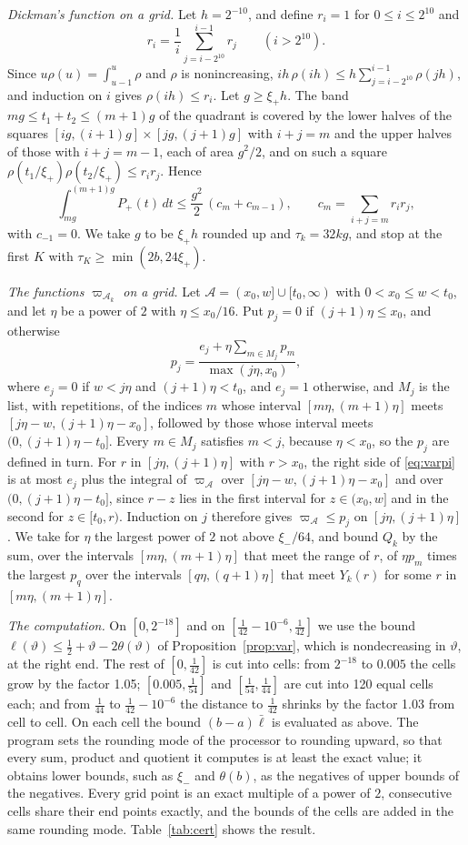 \documentclass[aps,prd,twocolumn,superscriptaddress,nofootinbib,longbibliography,floatfix,showkeys,nobalancelastpage,amsmath,amssymb,10pt]{revtex4-2}
\theoremstyle{plain}
\theoremstyle{definition}
\theoremstyle{plain}
\begin{document}
\emph{Dickman's function on a grid.} Let $h=2^{-10}$, and define $r_i=1$ for $0\le i\le2^{10}$ and
\[
r_i=\frac1i\sum_{j=i-2^{10}}^{i-1}r_j\qquad(i>2^{10}).
\]
Since $u\rho(u)=\int_{u-1}^u\rho$ and $\rho$ is nonincreasing, $ih\,\rho(ih)\le h\sum_{j=i-2^{10}}^{i-1}\rho(jh)$, and induction on $i$ gives $\rho(ih)\le r_i$. Let $g\ge\xi_+h$. The band $mg\le t_1+t_2\le(m+1)g$ of the quadrant is covered by the lower halves of the squares $[ig,(i+1)g]\times[jg,(j+1)g]$ with $i+j=m$ and the upper halves of those with $i+j=m-1$, each of area $g^2/2$, and on such a square $\rho(t_1/\xi_+)\rho(t_2/\xi_+)\le r_ir_j$. Hence
\[
\int_{mg}^{(m+1)g}P_+(t)\,dt\le\frac{g^2}2\,(c_m+c_{m-1}),\qquad c_m=\sum_{i+j=m}r_ir_j,
\]
with $c_{-1}=0$. We take $g$ to be $\xi_+h$ rounded up and $\tau_k=32kg$, and stop at the first $K$ with $\tau_K\ge\min(2b,24\xi_+)$.

\emph{The functions $\varpi_{\mathcal A_k}$ on a grid.} Let $\mathcal A=(x_0,w]\cup[t_0,\infty)$ with $0<x_0\le w<t_0$, and let $\eta$ be a power of $2$ with $\eta\le x_0/16$. Put $p_j=0$ if $(j+1)\eta\le x_0$, and otherwise
\[
p_j=\frac{e_j+\eta\sum_{m\in M_j}p_m}{\max(j\eta,x_0)},
\]
where $e_j=0$ if $w<j\eta$ and $(j+1)\eta<t_0$, and $e_j=1$ otherwise, and $M_j$ is the list, with repetitions, of the indices $m$ whose interval $[m\eta,(m+1)\eta]$ meets $[j\eta-w,(j+1)\eta-x_0]$, followed by those whose interval meets $(0,(j+1)\eta-t_0]$. Every $m\in M_j$ satisfies $m<j$, because $\eta<x_0$, so the $p_j$ are defined in turn. For $r$ in $[j\eta,(j+1)\eta]$ with $r>x_0$, the right side of \eqref{eq:varpi} is at most $e_j$ plus the integral of $\varpi_{\mathcal A}$ over $[j\eta-w,(j+1)\eta-x_0]$ and over $(0,(j+1)\eta-t_0]$, since $r-z$ lies in the first interval for $z\in(x_0,w]$ and in the second for $z\in[t_0,r)$. Induction on $j$ therefore gives $\varpi_{\mathcal A}\le p_j$ on $[j\eta,(j+1)\eta]$. We take for $\eta$ the largest power of $2$ not above $\xi_-/64$, and bound $Q_k$ by the sum, over the intervals $[m\eta,(m+1)\eta]$ that meet the range of $r$, of $\eta p_m$ times the largest $p_q$ over the intervals $[q\eta,(q+1)\eta]$ that meet $Y_k(r)$ for some $r$ in $[m\eta,(m+1)\eta]$.

\emph{The computation.} On $[0,2^{-18}]$ and on $[\frac1{42}-10^{-6},\frac1{42}]$ we use the bound $\ell(\vartheta)\le\frac12+\vartheta-2\theta(\vartheta)$ of Proposition~\ref{prop:var}, which is nondecreasing in $\vartheta$, at the right end. The rest of $[0,\frac1{42}]$ is cut into cells: from $2^{-18}$ to $0.005$ the cells grow by the factor 1.05; $[0.005,\frac1{54}]$ and $[\frac1{54},\frac1{44}]$ are cut into 120 equal cells each; and from $\frac1{44}$ to $\frac1{42}-10^{-6}$ the distance to $\frac1{42}$ shrinks by the factor 1.03 from cell to cell. On each cell the bound $(b-a)\bar\ell$ is evaluated as above. The program sets the rounding mode of the processor to rounding upward, so that every sum, product and quotient it computes is at least the exact value; it obtains lower bounds, such as $\xi_-$ and $\theta(b)$, as the negatives of upper bounds of the negatives. Every grid point is an exact multiple of a power of $2$, consecutive cells share their end points exactly, and the bounds of the cells are added in the same rounding mode. Table~\ref{tab:cert} shows the result.
\end{document}

